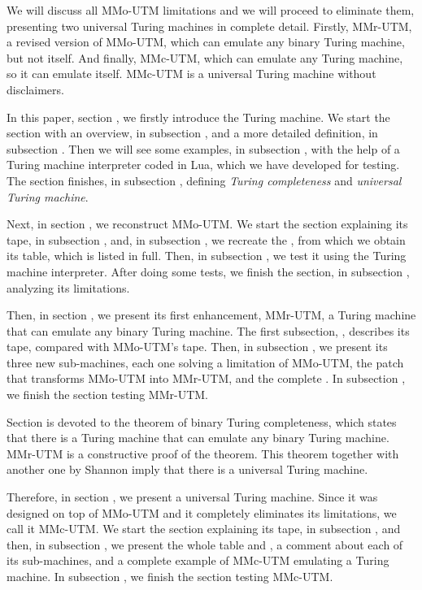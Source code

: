 We will discuss all MMo-UTM limitations
and we will proceed to eliminate them,
presenting two universal Turing machines in complete detail.
\beginpoints
\point Firstly, MMr-UTM, a revised version of MMo-UTM,
 which can emulate any binary Turing machine, but not itself.
\point And finally, MMc-UTM, which can emulate any Turing machine,
 so it can emulate itself.
 MMc-UTM is a universal Turing machine without disclaimers.
\endpoints

\break

In this paper, section ,
we firstly introduce the Turing machine.
We start the section with an overview,
 in subsection ,
and a more detailed definition, in subsection .
Then we will see some examples, in subsection ,
with the help of a Turing machine interpreter coded in Lua,
which we have developed for testing.
The section finishes, in subsection ,
 defining {\em Turing completeness} and {\em universal Turing machine}.

Next, in section , we reconstruct MMo-UTM.
We start the section explaining its tape,
in subsection , and,
in subsection , we recreate
 the ,
from which we obtain its table, which is listed in full.
Then, in subsection ,
we test it using the Turing machine interpreter.
After doing some tests, we finish the section,
 in subsection ,
analyzing its limitations.

Then, in section ,
we present its first enhancement, MMr-UTM,
a Turing machine that can emulate any binary Turing machine.
The first subsection, , describes its tape,
compared with MMo-UTM's tape.
Then, in subsection , we present its
three new sub-machines, each one solving a limitation of MMo-UTM,
the patch that transforms MMo-UTM into MMr-UTM,
and the complete .
In subsection , we finish the section
testing MMr-UTM.

Section 
is devoted to the theorem of binary Turing completeness,
which states that there is a Turing machine
that can emulate any binary Turing machine.
MMr-UTM is a constructive proof of the theorem.
This theorem together with another one by Shannon
imply that there is a universal Turing machine.

Therefore, in section ,
we present a universal Turing machine.
Since it was designed on top of MMo-UTM
and it completely eliminates its limitations,
we call it MMc-UTM.
We start the section explaining its tape,
in subsection ,
and then, in subsection ,
we present the whole table and
,
a comment about each of its sub-machines,
and a complete example of MMc-UTM emulating
a Turing machine. In subsection ,
we finish the section testing MMc-UTM.

